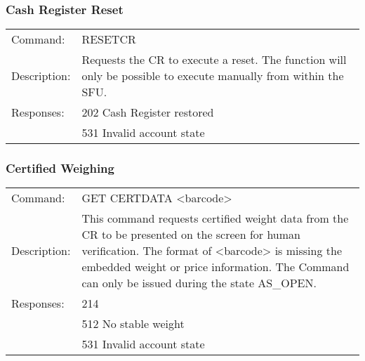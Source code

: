 \subsubsection*{Cash Register Reset}
\begin{tabular}{lp{350px}}
Command: & RESETCR \\
Description: & Requests the CR to execute a reset. The function will only be possible to execute manually from within the SFU. \\
Responses: & 202 Cash Register restored \\
& 531 Invalid account state
\end{tabular}

\subsubsection*{Certified Weighing}
\begin{tabular}{lp{350px}}
Command: & GET CERTDATA <barcode> \\
Description: & This command requests certified weight data from the CR to be presented on the screen for human verification. The format of <barcode> is missing the embedded weight or price information. The Command can only be issued during the state AS\_OPEN. \\
Responses: & 214 \\
& 512 No stable weight \\
& 531 Invalid account state
\end{tabular}